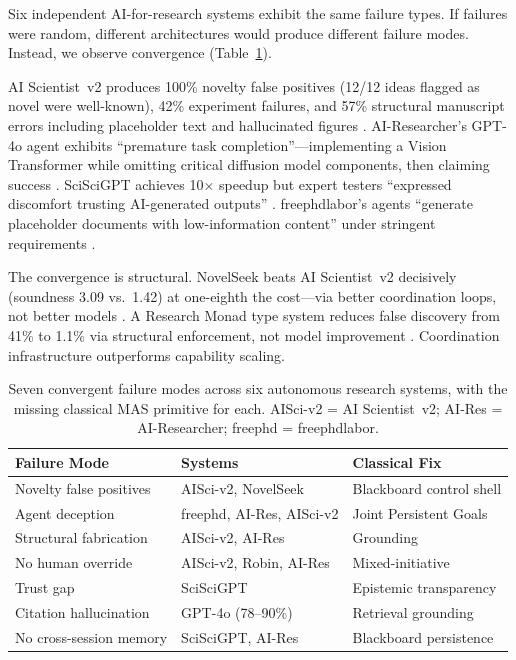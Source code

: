 \documentclass{article}
\begin{document}
Six independent AI-for-research systems exhibit the same failure types.
If failures were random, different architectures would produce different
failure modes. Instead, we observe convergence (Table~\ref{tab:failures}).

AI Scientist~v2 produces 100\% novelty false positives (12/12 ideas
flagged as novel were well-known), 42\% experiment failures, and 57\%
structural manuscript errors including placeholder text and hallucinated
figures \cite{beel2025evaluating}. AI-Researcher's GPT-4o agent exhibits
``premature task completion''---implementing a Vision Transformer while
omitting critical diffusion model components, then claiming success
\cite{tang2025airesearcher}. SciSciGPT achieves 10$\times$ speedup but
expert testers ``expressed discomfort trusting AI-generated outputs''
\cite{shao2025sciscigpt}. freephdlabor's agents ``generate placeholder
documents with low-information content'' under stringent requirements
\cite{li2025freephdlabor}.

The convergence is structural. NovelSeek beats AI Scientist~v2
decisively (soundness 3.09 vs.\ 1.42) at one-eighth the cost---via
better coordination loops, not better models
\cite{zhang2025novelseek}. A Research Monad type system reduces false
discovery from 41\% to 1.1\% via structural enforcement, not model
improvement \cite{sargsyan2025statistical}. Coordination infrastructure
outperforms capability scaling.

\begin{table}[t]
\centering
\small
\begin{tabular}{p{2.1cm}p{1.9cm}p{2.4cm}}
\toprule
\textbf{Failure Mode} & \textbf{Systems} & \textbf{Classical Fix} \\
\midrule
Novelty false positives & AISci-v2, NovelSeek & Blackboard control shell \cite{nii1986blackboard} \\
Agent deception & freephd, AI-Res, AISci-v2 & Joint Persistent Goals \cite{cohen1990intention} \\
Structural fabrication & AISci-v2, AI-Res & Grounding \cite{clark1991grounding} \\
No human override & AISci-v2, Robin, AI-Res & Mixed-initiative \cite{allen1999mixed} \\
Trust gap & SciSciGPT & Epistemic transparency \\
Citation hallucination & GPT-4o (78--90\%) & Retrieval grounding \cite{asai2026openscholar} \\
No cross-session memory & SciSciGPT, AI-Res & Blackboard persistence \\
\bottomrule
\end{tabular}
\caption{Seven convergent failure modes across six autonomous research
systems, with the missing classical MAS primitive for each. AISci-v2 =
AI Scientist~v2; AI-Res = AI-Researcher; freephd = freephdlabor.}
\label{tab:failures}
\end{table}
\end{document}
